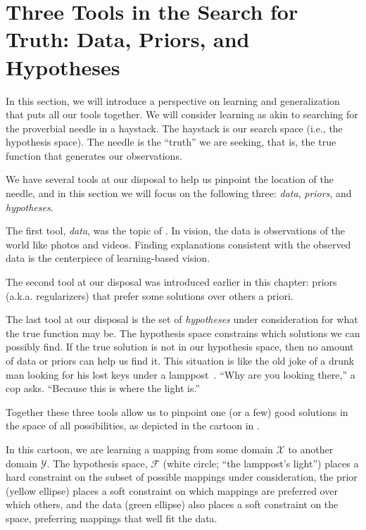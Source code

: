 \section{Three Tools in the Search for Truth: Data, Priors, and Hypotheses}

In this section, we will introduce a perspective on learning and generalization that puts all our tools together. We will consider learning as akin to searching for the proverbial needle in a haystack. The haystack is our search space (i.e., the hypothesis space). The needle is the ``truth'' we are seeking, that is, the true function that generates our observations. 

We have several tools at our disposal to help us pinpoint the location of the needle, and in this section we will focus on the following three: \textit{data}, \textit{priors}, and \textit{hypotheses}. 

The first tool, \textit{data}, was the topic of \chap{\ref{chapter:intro_to_learning}}. In vision, the data is observations of the world like photos and videos. Finding explanations consistent with the observed data is the centerpiece of learning-based vision.

The second tool at our disposal was introduced earlier in this chapter: priors (a.k.a. regularizers) that prefer some solutions over others a priori. 

The last tool at our disposal is the set of \textit{hypotheses} under consideration for what the true function may be. The hypothesis space constrains which solutions we can possibly find. If the true solution is not in our hypothesis space, then no amount of data or priors can help us find it. This situation is like the old joke of a drunk man looking for his lost keys under a lamppost~\cite{freedman2010wrong}. ``Why are you looking there,'' a cop asks. ``Because this is where the light is.''

Together these three tools allow us to pinpoint one (or a few) good solutions in the space of all possibilities, as depicted in the cartoon in \fig{\ref{fig:problem_of_generalization:search_space_tools}}.

In this cartoon, we are learning a mapping from some domain $\mathcal{X}$ to another domain $\mathcal{Y}$. The hypothesis space, $\mathcal{F}$ (white circle; ``the lamppost's light'') places a hard constraint on the subset of possible mappings under consideration, the prior (yellow ellipse) places a soft constraint on which mappings are preferred over which others, and the data (green ellipse) also places a soft constraint on the space, preferring mappings that well fit the data. 


